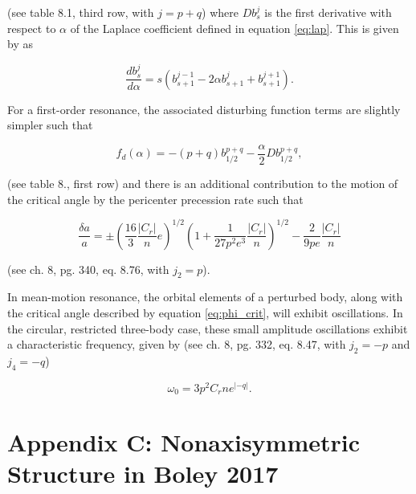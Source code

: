 \noindent (see \cite{murray99} table 8.1, third row, with $j = p + q$) where $D b^{j}_{s}$ is the first derivative with respect to $
\alpha$ of the Laplace coefficient defined in equation \ref{eq:lap}. This is given by \cite{brouwer61} as

\begin{equation}\label{eq:lap_d}
	\frac{d b_{s}^{j}}{d \alpha} = s \left( b_{s+1}^{j-1} - 2 \alpha b_{s+1}^{j} + b_{s+1}^{j+1} \right).
\end{equation}

For a first-order resonance, the associated disturbing function terms are slightly simpler such that

\begin{equation}\label{eq:fd_fo}
	f_{d}(\alpha) = -(p+q) b_{1/2}^{p+q} - \frac{\alpha}{2} D b_{1/2}^{p+q},
\end{equation}

\noindent (see \cite{murray99} table 8., first row) and there is an additional contribution to the motion of the critical angle by the 
pericenter precession rate such that

\begin{equation}\label{eq:res_fo}
	\frac{\delta a}{a} = \pm \left(\frac{16}{3} \frac{\left| C_{r} \right|}{n} e \right)^{1/2} \left(  1 + \frac{1}{27 p^2 e^3} \frac{\left| C_{r} \right|}{n} 
	\right)^{1/2} - \frac{2}{9 p e}  \frac{\left| C_{r} \right|}{n}
\end{equation}


\noindent (see \cite{murray99} ch. 8, pg. 340, eq. 8.76, with $j_{2} = p$).

In mean-motion resonance, the orbital elements of a perturbed body, along with the critical angle described by equation
\ref{eq:phi_crit}, will exhibit oscillations. In the circular, restricted three-body case, these small amplitude oscillations exhibit a 
characteristic frequency, given by (see \cite{murray99} ch. 8, pg. 332, eq. 8.47, with $j_{2} =-p$ and $j_{4} = -q$)

\begin{equation}\label{eq:lib_time}
	\omega_{0} = 3 p^{2} C_{r} n e^{\left| -q \right|}.
\end{equation}

\section{Appendix C: Nonaxisymmetric Structure in Boley 2017}\label{sec:boley_plot}

